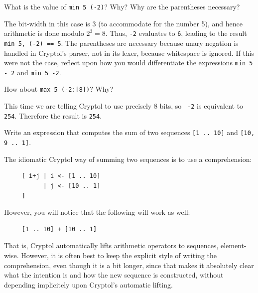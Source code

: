 \begin{Exercise}\label{ex:arith:5}
  What is the value of {\tt min 5 (-2)}?  Why?  Why are the
  parentheses necessary?\indMin\indModular\indUnaryMinus
\end{Exercise}
\begin{Answer}
  The bit-width in this case is 3 (to accommodate for the number 5),
  and hence arithmetic is done modulo $2^3 = 8$. Thus, {\tt -2}
  evaluates to {\tt 6}, leading to the result {\tt min 5, (-2) == 5}.
  The parentheses are necessary because unary negation is handled in
  Cryptol's parser, not in its lexer, because whitespace is ignored.
  If this were not the case, reflect upon how you would differentiate
  the expressions \texttt{min 5 - 2} and \texttt{min 5 -2}.
\end{Answer}

\begin{Exercise}\label{ex:arith:6}
How about {\tt max 5 (-2:[8])}? Why?\indMin\indModular\indUnaryMinus
\end{Exercise}
\begin{Answer}
  This time we are telling Cryptol to use precisely 8 bits, so {\tt
    -2} is equivalent to {\tt 254}. Therefore the result is {\tt 254}.
\end{Answer}

\begin{Exercise}\label{ex:arith:7}
  Write an expression that computes the sum of two sequences {\tt [1
    .. 10]} and {\tt [10, 9 .. 1]}.\indPlus
\end{Exercise}
\begin{Answer}
  The idiomatic Cryptol way of summing two sequences is to use a
  comprehension:\indComp
\begin{Verbatim}
     [ i+j | i <- [1 .. 10]
           | j <- [10 .. 1]
     ]
\end{Verbatim}
However, you will notice that the following will work as well:
\begin{Verbatim}
     [1 .. 10] + [10 .. 1]
\end{Verbatim}
That is, Cryptol automatically lifts arithmetic operators to
sequences, element-wise. However, it is often best to keep the
explicit style of writing the comprehension, even though it is a bit
longer, since that makes it absolutely clear what the intention is and
how the new sequence is constructed, without depending implicitely
upon Cryptol's automatic lifting.\indArithLift
\end{Answer}

